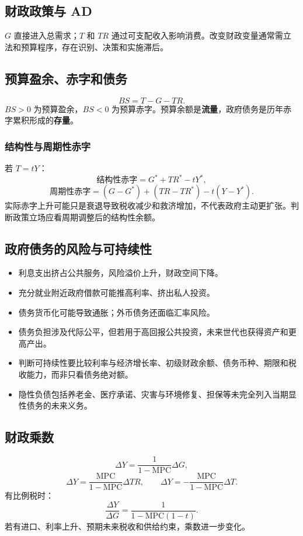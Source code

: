 \documentclass[UTF8,11pt,a4paper]{ctexart}
\newcommand{\term}[1]{\textbf{#1}}
\newcommand{\MPC}{\mathrm{MPC}}
\begin{document}
\subsection{财政政策与 AD}
$G$ 直接进入总需求；$T$ 和 $TR$ 通过可支配收入影响消费。改变财政变量通常需立法和预算程序，存在识别、决策和实施滞后。

\subsection{预算盈余、赤字和债务}
\[
BS=T-G-TR.
\]
$BS>0$ 为预算盈余，$BS<0$ 为预算赤字。预算余额是\term{流量}，政府债务是历年赤字累积形成的\term{存量}。

\subsubsection{结构性与周期性赤字}
若 $T=tY$：
\[
\text{结构性赤字}=G^*+TR^*-tY^*,
\]
\[
\text{周期性赤字}=(G-G^*)+(TR-TR^*)-t(Y-Y^*).
\]
实际赤字上升可能只是衰退导致税收减少和救济增加，不代表政府主动更扩张。判断政策立场应看周期调整后的结构性余额。

\subsection{政府债务的风险与可持续性}
\begin{itemize}
  \item 利息支出挤占公共服务，风险溢价上升，财政空间下降。
  \item 充分就业附近政府借款可能推高利率、挤出私人投资。
  \item 债务货币化可能导致通胀；外币债务还面临汇率风险。
  \item 债务负担涉及代际公平，但若用于高回报公共投资，未来世代也获得资产和更高产出。
  \item 判断可持续性要比较利率与经济增长率、初级财政余额、债务币种、期限和税收能力，而非只看债务绝对额。
  \item 隐性负债包括养老金、医疗承诺、灾害与环境修复、担保等未完全列入当期显性债务的未来义务。
\end{itemize}

\subsection{财政乘数}
\[
\Delta Y=\frac{1}{1-\MPC}\Delta G,
\]
\[
\Delta Y=\frac{\MPC}{1-\MPC}\Delta TR,
\qquad
\Delta Y=-\frac{\MPC}{1-\MPC}\Delta T.
\]
有比例税时：
\[
\frac{\Delta Y}{\Delta G}=\frac{1}{1-\MPC(1-t)}.
\]
若有进口、利率上升、预期未来税收和供给约束，乘数进一步变化。
\end{document}

